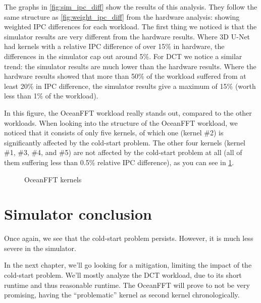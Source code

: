The graphs in \cref{fig:sim_ipc_diff} show the results of this analysis.
They follow the same structure as \cref{fig:weight_ipc_diff} from the hardware analysis: showing weighted IPC differences for each workload.
The first thing we noticed is that the simulator results are very different from the hardware results.
Where 3D U-Net had kernels with a relative IPC difference of over 15\% in hardware, the differences in the simulator cap out around 5\%.
For DCT we notice a similar trend: the simulator results are much lower than the hardware results.
Where the hardware results showed that more than 50\% of the workload suffered from at least 20\% in IPC difference, the simulator results give a maximum of 15\% (worth less than 1\% of the workload).

In this figure, the OceanFFT workload really stands out, compared to the other workloads.
When looking into the structure of the OceanFFT workload, we noticed that it consists of only five kernels, of which one (kernel \#2) is significantly affected by the cold-start problem.
The other four kernels (kernel \#1, \#3, \#4, and \#5) are not affected by the cold-start problem at all (all of them suffering less than 0.5\% relative IPC difference), as you can see in \cref{fig:ocean_kernels}.

\begin{figure}[ht]
    \centering
    \resizebox{0.45\textwidth}{!}{}
    \caption{OceanFFT kernels}
    \label{fig:ocean_kernels}
\end{figure}

\FloatBarrier
\section{Simulator conclusion}\label{sec:simulator-conclusion}
Once again, we see that the cold-start problem persists.
However, it is much less severe in the simulator.

In the next chapter, we'll go looking for a mitigation, limiting the impact of the cold-start problem.
We'll mostly analyze the DCT workload, due to its short runtime and thus reasonable runtime.
The OceanFFT will prove to not be very promising, having the ``problematic'' kernel as second kernel chronologically.